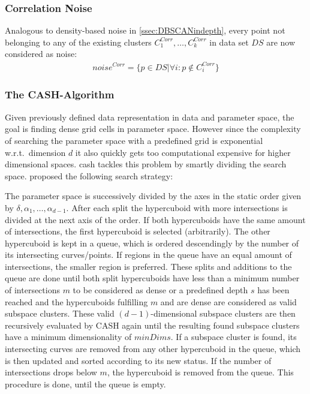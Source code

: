 \subsubsection*{Correlation Noise}
Analogous to density-based noise in \autoref{ssec:DBSCANindepth}, every point not belonging to any of the existing clusters $C^{Corr}_1, \dotsc, C^{Corr}_k$ in data set $DS$ are now considered as noise: 
\begin{align}
    noise^{Corr} = \{p \in  DS | \forall i : p \notin C^{Corr}_i\}
\end{align}

\subsubsection*{The CASH-Algorithm}
Given previously defined data representation in data and parameter space, the goal is finding dense grid cells in parameter space. However since the complexity of searching the parameter space with a predefined grid is exponential w.r.t.\ dimension $d$ it also quickly gets too computational expensive for higher dimensional spaces. \gls{cash} tackles this problem by smartly dividing the search space. \citeauthor{CASHachtert2008robust} proposed the following search strategy:
\vspace{5mm}

The parameter space is successively divided by the axes in the static order given by $\delta,\alpha_1,\dotsc,\alpha_{d-1}$. After each split the hypercuboid with more intersections is divided at the next axis of the order. If both hypercuboids have the same amount of intersections, the first hypercuboid is selected (arbitrarily). The other hypercuboid is kept in a queue, which is ordered descendingly by the number of its intersecting curves/points. If regions in the queue have an equal amount of intersections, the smaller region is preferred. These splits and additions to the queue are done until both split hypercuboids have less than a minimum number of intersections $m$ to be considered as dense or a predefined depth $s$ has been reached and the hypercuboids fulfilling $m$ and are dense are considered as valid subspace clusters. These valid $(d-1)$-dimensional subspace clusters are then recursively evaluated by CASH again until the resulting found subspace clusters have a minimum dimensionality of $minDims$. If a subspace cluster is found, its intersecting curves are removed from any other hypercuboid in the queue, which is then updated and sorted according to its new status. If the number of intersections drops below $m$, the hypercuboid is removed from the queue. This procedure is done, until the queue is empty.


